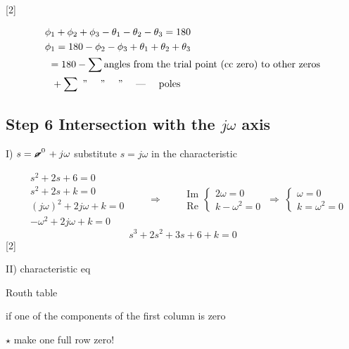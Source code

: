 \documentclass[11pt,a4paper]{article}
\begin{document}
[2]

\[\begin{aligned}
 &\phi_1+\phi_2+\phi_3-\theta_1-\theta_2-\theta_3=180 \\
 &\phi_1=180-\phi_2-\phi_3+\theta_1+\theta_2+\theta_3 \\
 &\ =180-\sum\text{angles from the trial point (cc zero) to other zeros} \\
 &\ \ +\sum\ \text{'' \quad '' \quad '' \quad --- \quad poles}
\end{aligned}\]

\subsection{Step 6 \quad Intersection with the $j\omega$ axis}
I) \quad $s=\mbox{\tikz[baseline=(X.base)]{\node[inner sep=0pt](X){$\sigma$};\draw[line width=0.8pt] (X.south west) -- (X.north east);\node[above right,font=\scriptsize,inner sep=0pt] at (X.north east) {0};}}\,+j\omega$ \hfill substitute $s=j\omega$ in the characteristic

\[\begin{aligned}
 & s^2+2s+6=0 \\
 & s^2+2s+k=0 \\
 & (j\omega)^2+2j\omega+k=0 \\
 & -\omega^2+2j\omega+k=0
\end{aligned}
\qquad\Rightarrow\qquad
\begin{array}{r}\text{Im}\\[3mm] \text{Re}\end{array}
\left\{\begin{array}{l} 2\omega=0 \\ k-\omega^2=0 \end{array}\right.
\ \Rightarrow\ \left\{\begin{array}{l} \omega=0 \\ k=\omega^2=0 \end{array}\right. \]
\[ s^3+2s^2+3s+6+k=0 \]
[2]

II) characteristic eq

\hspace*{2em}Routh table

\hspace*{2em}if one of the components of the first column is zero

\hspace*{2em}$\star$ make one full row zero!
\end{document}
